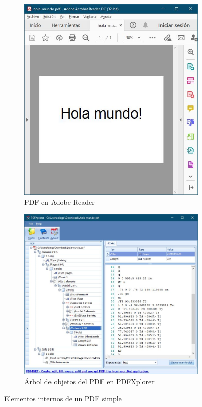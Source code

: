 \begin{figure}
	\centering
	\begin{subfigure}[b]{0.29\textwidth}
		\centering
		\includegraphics[width=\textwidth]{imaxes/c-bases-teoricas/hola-mundo-adobe-reader}
		\caption{PDF en Adobe Reader}
		\label{fig:hola-mundo-adobe-reader}
	\end{subfigure}
	\hfill
	\begin{subfigure}[b]{0.7\textwidth}
		\centering
		\includegraphics[width=\textwidth]{imaxes/c-bases-teoricas/hola-mundo-pdfxplorer}
		\caption{Árbol de objetos del PDF en PDFXplorer}
		\label{fig:hola-mundo-pdfxplorer}
	\end{subfigure}
	\caption{Elementos internos de un PDF simple}
	\label{fig:estructura-interna-pdf}
\end{figure}


